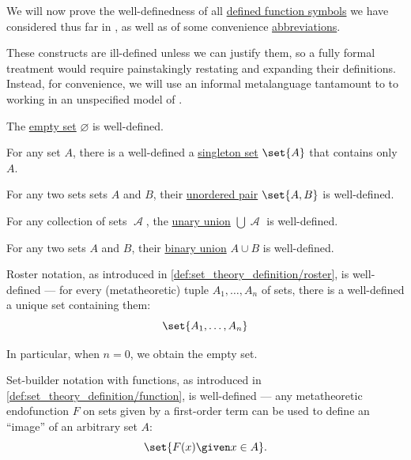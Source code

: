 \begin{proposition}\label{thm:zfc_existence_theorems}
  We will now prove the well-definedness of all \hyperref[def:fol_definition/function]{defined function symbols} we have considered thus far in , as well as of some convenience \hyperref[con:syntactic_abbreviation]{abbreviations}.

  These constructs are ill-defined unless we can justify them, so a fully formal treatment would require painstakingly restating and expanding their definitions. Instead, for convenience, we will use an informal metalanguage tantamount to to working in an unspecified model of .

  \begin{thmenum}
     The \hyperref[def:empty_set]{empty set} \( \varnothing \) is well-defined.

     For any set \( A \), there is a well-defined a \hyperref[def:singleton_set]{singleton set} \( \set{ A } \) that contains only \( A \).

     For any two sets sets \( A \) and \( B \), their \hyperref[def:unordered_pair]{unordered pair} \( \set{ A, B } \) is well-defined.

     For any collection of sets \( \mscrA \), the \hyperref[def:set_union/unary]{unary union} \( \bigcup \mscrA \) is well-defined.

     For any two sets \( A \) and \( B \), their \hyperref[def:set_union/binary]{binary union} \( A \cup B \) is well-defined.

     Roster notation, as introduced in \cref{def:set_theory_definition/roster}, is well-defined --- for every (metatheoretic) tuple \( A_1, \ldots, A_n \) of sets, there is a well-defined a unique set containing them:
    \begin{equation*}
      \set{ A_1, \ldots, A_n }
    \end{equation*}

    In particular, when \( n = 0 \), we obtain the empty set.

     Set-builder notation with functions, as introduced in \cref{def:set_theory_definition/function}, is well-defined --- any metatheoretic endofunction \( F \) on sets given by a first-order term can be used to define an \enquote{image} of an arbitrary set \( A \):
    \begin{equation*}
      \set{ F(x) \given x \in A }.
    \end{equation*}


\end{thmenum}
\end{proposition}
